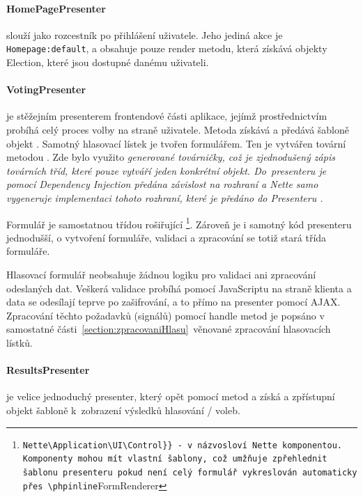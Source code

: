 \paragraph{HomePagePresenter} slouží jako rozcestník po přihlášení uživatele. Jeho jediná akce je \texttt{Homepage:default}, a obsahuje pouze render metodu, která získává objekty Election, které jsou dostupné danému uživateli.


\paragraph{VotingPresenter} je stěžejním presenterem frontendové části aplikace, jejímž prostřednictvím probíhá celý proces volby na straně uživatele. Metoda  získává a   předává šabloně objekt . Samotný hlasovací lístek je tvořen formulářem. Ten je vytvářen tovární metodou . Zde bylo využito \it{generované továrničky}, což je zjednodušený zápis továrních tříd, které pouze vytváří jeden konkrétní objekt. Do~presenteru je pomocí Dependency Injection předána závislost na rozhraní  a Nette samo vygeneruje implementaci tohoto rozhraní, které je předáno do Presenteru \cite{Planette}.

Formulář  je samostatnou třídou rošiřující \footnote{\Verb{Nette\Application\UI\Control}} - v názvosloví Nette komponentou. Komponenty mohou mít vlastní šablony, což umžňuje zpřehlednit šablonu presenteru pokud není celý formulář vykreslován automaticky přes \phpinline{FormRenderer}. Zároveň je i samotný kód presenteru jednodušší, o vytvoření formuláře, validaci a zpracování se totiž stará třída formuláře.

Hlasovací formulář neobsahuje žádnou logiku pro validaci ani zpracování odeslaných dat. Veškerá validace probíhá pomocí JavaScriptu na straně klienta a data se odesílají teprve po zašifrování, a to přímo na presenter pomocí AJAX. Zpracování těchto požadavků (signálů) pomocí handle metod je popsáno v samostatné části~\ref{section:zpracovaniHlasu}~věnované zpracování hlasovacích lístků.


\paragraph{ResultsPresenter} je velice jednoduchý presenter, který opět pomocí metod  a  získá a zpřístupní objekt  šabloně k~zobrazení výsledků hlasování / voleb.




